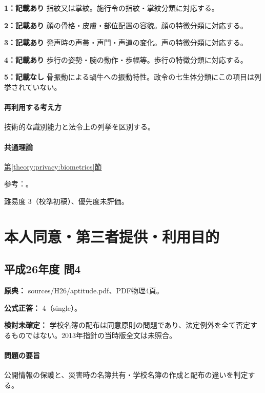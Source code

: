 \noindent\textbf{1：記載あり} 指紋又は掌紋。施行令の指紋・掌紋分類に対応する。\par

\noindent\textbf{2：記載あり} 顔の骨格・皮膚・部位配置の容貌。顔の特徴分類に対応する。\par

\noindent\textbf{3：記載あり} 発声時の声帯・声門・声道の変化。声の特徴分類に対応する。\par

\noindent\textbf{4：記載あり} 歩行の姿勢・腕の動作・歩幅等。歩行の特徴分類に対応する。\par

\noindent\textbf{5：記載なし} 骨振動による蝸牛への振動特性。政令の七生体分類にこの項目は列挙されていない。\par

\paragraph{再利用する考え方} 技術的な識別能力と法令上の列挙を区別する。

\paragraph{共通理論} \hyperref[theory:privacy:biometrics]{第\ref*{theory:privacy:biometrics}節}

\par 参考：\cite{privacy_general}。

\par 難易度 3（校準初稿）、優先度未評価。

\section{本人同意・第三者提供・利用目的}

\subsection{平成26年度 問4}
\label{q:h26-reg-apt-04}

\noindent\textbf{原典：} sources/H26/aptitude.pdf、PDF物理4頁。

\textbf{公式正答：} 4（single）。

\par\textbf{検討未確定：} 学校名簿の配布は同意原則の問題であり、法定例外を全て否定するものではない。2013年指針の当時版全文は未照合。

\paragraph{問題の要旨} 公開情報の保護と、災害時の名簿共有・学校名簿の作成と配布の違いを判定する。

